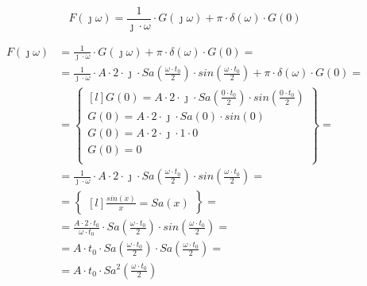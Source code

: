 \begin{task}

\begin{equation}
F(\jmath \omega) = \frac{1}{\jmath \cdot \omega} \cdot G(\jmath \omega) + \pi \cdot \delta(\omega) \cdot G(0)
\end{equation}

\begin{align*}
F(\jmath \omega)&= \frac{1}{\jmath \cdot \omega} \cdot G(\jmath \omega) + \pi \cdot \delta(\omega) \cdot G(0)=\\
&=\frac{1}{\jmath \cdot \omega} \cdot A \cdot 2 \cdot \jmath \cdot Sa\left(\frac{\omega \cdot t_{0}}{2}\right) \cdot sin\left(\frac{\omega \cdot t_{0}}{2}\right)+ \pi \cdot \delta(\omega) \cdot G(0)=\\
&=\begin{Bmatrix*}[l]
G(0)=A \cdot 2 \cdot \jmath \cdot Sa\left(\frac{0 \cdot t_{0}}{2}\right) \cdot sin\left(\frac{0 \cdot t_{0}}{2}\right)\\
G(0)=A \cdot 2 \cdot \jmath \cdot Sa(0) \cdot sin(0)\\
G(0)=A \cdot 2 \cdot \jmath \cdot 1 \cdot 0\\
G(0)=0\\
\end{Bmatrix*}=\\
&=\frac{1}{\jmath \cdot \omega} \cdot A \cdot 2 \cdot \jmath \cdot Sa\left(\frac{\omega \cdot t_{0}}{2}\right) \cdot sin\left(\frac{\omega \cdot t_{0}}{2}\right)=\\
&=\begin{Bmatrix*}[l]
\frac{sin(x)}{x}=Sa(x)
\end{Bmatrix*}=\\
&=\frac{A \cdot 2 \cdot t_{0}}{\omega \cdot t_{0}} \cdot Sa\left(\frac{\omega \cdot t_{0}}{2}\right) \cdot sin\left(\frac{\omega \cdot t_{0}}{2}\right)=\\
&=A \cdot t_{0} \cdot Sa\left(\frac{\omega \cdot t_{0}}{2}\right) \cdot Sa\left(\frac{\omega \cdot t_{0}}{2}\right)=\\
&= A \cdot t_{0} \cdot Sa^{2}(\frac{\omega \cdot t_{0}}{2})
\end{align*}



\end{task}
